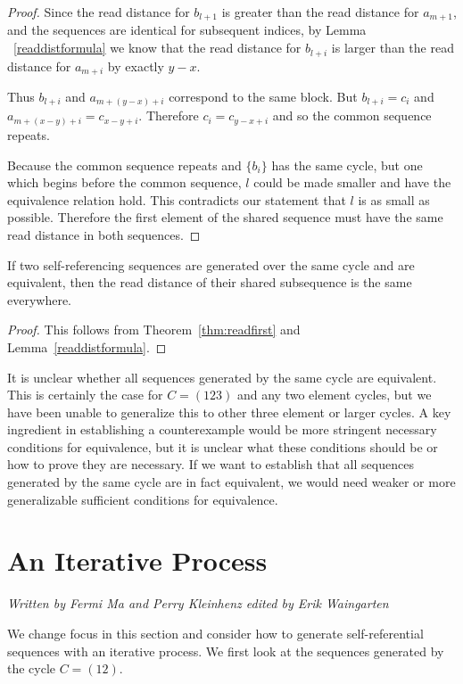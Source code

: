 \documentclass[runningheads,a4paper]{llncs}
\begin{document}
\begin{proof}
Since the read distance for $b_{l+1}$ is greater than the read distance for $a_{m+1}$, and the sequences are identical for subsequent indices, by Lemma ~\ref{readdistformula} we know that the read distance for $b_{l+i}$ is larger than the read distance for $a_{m+i}$ by exactly $y-x$. 

Thus $b_{l+i}$ and $a_{m+(y-x)+i}$ correspond to the same block. But $b_{l+i} = c_{i}$ and $a_{m+(x-y)+i}=c_{x-y+i}$. Therefore $c_{i} = c_{y-x+i}$ and so the common sequence repeats. 

Because the common sequence repeats and $\{b_i\}$ has the same cycle, but one which begins before the common sequence, $l$ could be made smaller and have the equivalence relation hold. This contradicts our statement that $l$ is as small as possible. Therefore the first element of the shared sequence must have the same read distance in both sequences. 
\end{proof}

\begin{corollary}
If two self-referencing sequences are generated over the same cycle and are equivalent, then the read distance of their shared subsequence is the same everywhere.
\end{corollary}

\begin{proof}
This follows from Theorem~\ref{thm:readfirst} and Lemma~\ref{readdistformula}.
\end{proof}

It is unclear whether all sequences generated by the same cycle are equivalent. This is certainly the case for $C=(123)$ and any two element cycles, but we have been unable to generalize this to other three element or larger cycles. A key ingredient in establishing a counterexample would be more stringent necessary conditions for equivalence, but it is unclear what these conditions should be or how to prove they are necessary. If we want to establish that all sequences generated by the same cycle are in fact equivalent, we would need weaker or more generalizable sufficient conditions for equivalence. 

\section{An Iterative Process}
\label{iterativeprocess}

\emph{Written by Fermi Ma and Perry Kleinhenz edited by Erik Waingarten}

We change focus in this section and consider how to generate self-referential sequences with an iterative process. We first look at the sequences generated by the cycle $C = (1 2)$.
\end{document}
